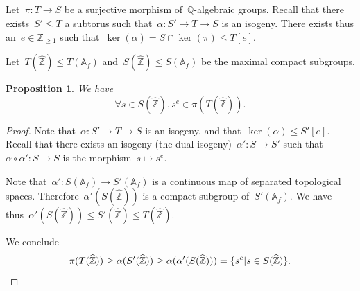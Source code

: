 \documentclass[12pt]{amsart}
\newtheorem{proposition}[theorem]{Proposition}
\newcommand{\Z}{{\mathbb Z}}
\newcommand{\Q}{{\mathbb Q}}
\newcommand{\A}{{\mathbb A}}
\newcommand{\wh}{\widehat}
\begin{document}
\subsection{}
Let~$\pi:T\to S$ be a surjective morphism of~$\Q$-algebraic groups. Recall that there exists~$S'\leq T$ a subtorus such that~$\alpha:S'\to T\to S$ is an isogeny. There exists thus an~$e\in\Z_{\geq1}$ such that~$\ker(\alpha)=S\cap \ker(\pi)\leq T[e]$.


Let~$T(\wh{\Z})\leq T(\A_f)$ and~$S(\wh{\Z})\leq S(\A_f)$ be the maximal compact subgroups. 
\begin{proposition}\label{prop:F2}
We have
\[
\forall s\in S(\wh{\Z}), s^e\in \pi(T(\wh{\Z})).
\]
\end{proposition}
\begin{proof}Note that~$\alpha:S'\to T\to S$ is an isogeny, and that~$\ker(\alpha)\leq S'[e]$. Recall that there exists an isogeny (the dual isogeny)~$\alpha':S\to S'$ such that~$\alpha\circ \alpha':S\to S$ is the morphism~$s\mapsto s^e$. 

Note that~$\alpha':S(\A_f)\to S'(\A_f)$ is a continuous map of separated topological spaces. Therefore~$\alpha'(S(\wh{\Z}))$ is a compact subgroup of~$S'(\A_f)$. We have thus~$\alpha'(S(\wh{\Z}))\leq S'(\wh{\Z})\leq T(\wh{\Z})$. 

We conclude
\[
\pi(T(\wh{\Z}))\geq \alpha(S'(\wh{\Z}))\geq \alpha(\alpha'(S(\wh{\Z})))=\{s^e|s\in S(\wh{\Z})\}.\qedhere
\]
\end{proof}
\end{document}
